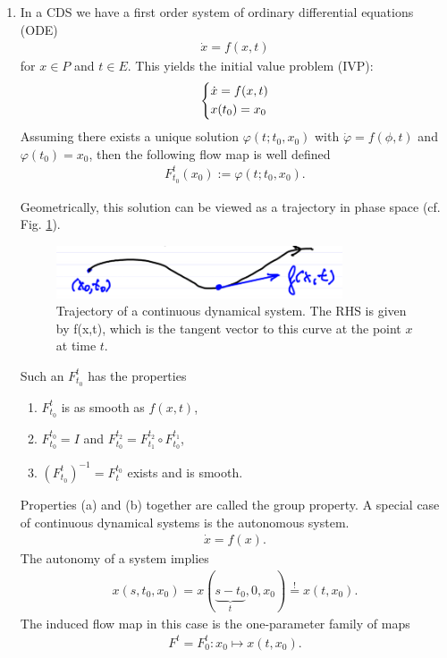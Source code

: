 \begin{enumerate}
\item In a CDS we have a first order system of ordinary differential equations (ODE)
	\begin{align}
		\boxed{
			\dot{ {x}} = f( {x},t)
		}
	\end{align}
	for $ {x}\in P$ and $t \in E$. This yields the initial value problem (IVP):
	\begin{align}
		\begin{dcases}
			\dot{ {x}} = f( {x},t) \\
			 {x}(t_0) =  {x}_0
		\end{dcases}
	\end{align}
	Assuming there exists a unique solution $\varphi(t; t_0,  {x}_0)$ with $\dot{\varphi} = f(\phi,t)$ and $\varphi(t_0)=  {x}_0$, then the following flow map is well defined
	\begin{align}
		\boxed{
		F_{t_0}^{t}( {x}_0) := \varphi(t; t_0,  {x}_0).}
	\end{align}

Geometrically, this solution can be viewed as a trajectory in phase space (cf. Fig. \ref{fig:cds_traj}).
	\begin{figure}[h!]
	\centering
	\includegraphics[width = 0.8\textwidth]{figures/intro/2CDS.png}
	\caption{Trajectory of a continuous dynamical system. The RHS is given by f(x,t), which is the tangent vector to this curve at the point $x$ at time $t$.} \label{fig:cds_traj}
	\end{figure}
	
	Such an $F_{t_0}^{t}$ has the properties
	\begin{enumerate}
		\item $F_{t_0}^{t}$ is as smooth as $f( {x},t)$,
		\item $F_{t_0}^{t_0} = I$ and $F_{t_0}^{t_2} = F_{t_1}^{t_2} \circ F_{t_0}^{t_1}$,
		\item $\left(F_{t_0}^{t}\right)^{-1} = F_{t}^{t_0}$ exists and is smooth.
\end{enumerate}
Properties (a) and (b) together are called the group property. A special case of continuous dynamical systems is the autonomous system.
\begin{align}
	\boxed{\dot{ {x}} = f( {x}).}	
\end{align}
The autonomy of a system implies
\begin{align}
	 {x}(s,t_0,  {x}_0) =  {x}(\underbrace{s-t_0}_{t}, 0,  {x}_0) \stackrel{!}{=}  {x}(t, {x}_0).
\end{align}
The induced flow map in this case is the one-parameter family of maps
\begin{align}
	\boxed{ F^{t} = F_{0}^{t}:  {x}_0 \mapsto  {x}(t, {x}_0).}
\end{align}
\end{enumerate}
